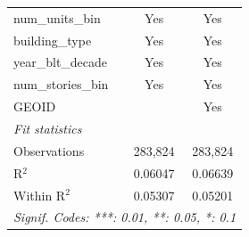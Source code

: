 \begin{tabular}{lcc}
   num\_units\_bin                                                     & Yes            & Yes\\  
   building\_type                                                      & Yes            & Yes\\  
   year\_blt\_decade                                                   & Yes            & Yes\\  
   num\_stories\_bin                                                   & Yes            & Yes\\  
   GEOID                                                               &                & Yes\\  
   \midrule
   \emph{Fit statistics}\\
   Observations                                                        & 283,824        & 283,824\\  
   R$^2$                                                               & 0.06047        & 0.06639\\  
   Within R$^2$                                                        & 0.05307        & 0.05201\\  
   \midrule \midrule
   \multicolumn{3}{l}{\emph{Signif. Codes: ***: 0.01, **: 0.05, *: 0.1}}\\
\end{tabular}
\par\endgroup
\begingroup
\centering
